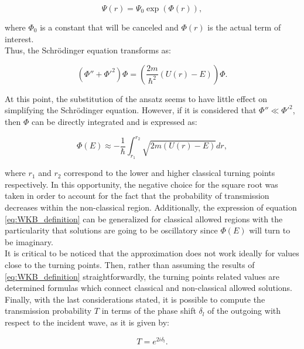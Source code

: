 \documentclass[openany]{book}
\begin{document}
\begin{equation} \label{eq:WKB_ansatz}
	\Psi(r) = \Psi_0\exp{(\Phi(r))},
\end{equation}

where $\Phi_0$ is a constant that will be canceled and $\Phi(r)$ is the actual term of interest. \\

Thus, the Schrödinger equation transforms as: 

\begin{equation} \label{eq:WKB_schrodinger}
	\left(\Phi'' + \Phi'^{2} \right)\Phi = \left(\frac{2m}{\hbar^2} (U(r) - E)\right) \Phi.
\end{equation}

At this point, the substitution of the ansatz seems to have little effect on simplifying the Schrödinger equation. However,  if it is considered that $\Phi'' \ll \Phi'^{2}$, then $\Phi$ can be directly integrated and is expressed as:

\begin{equation} \label{eq:WKB_definition}
	\Phi(E) \approx -\frac{1}{\hbar}\int_{r_1}^{r_2} {\sqrt{2m(U(r)-E)}} dr,
\end{equation}

where $r_1$ and $r_2$ correspond to the lower and higher classical turning points respectively. In this opportunity, the negative choice for the square root was taken in order to account for the fact that the probability of transmission decreases within the non-classical region. Additionally, the expression of equation \ref{eq:WKB_definition} can be generalized for classical allowed regions with the particularity that solutions are going to be oscillatory since $\Phi(E)$ will turn to be imaginary. \\

It is critical to be noticed that the approximation does not work ideally for values close to the turning points. Then, rather than assuming the results of \ref{eq:WKB_definition} straightforwardly, the turning points related values are determined formulas which connect classical and non-classical allowed solutions. \\

Finally, with the last considerations stated, it is possible to compute the transmission probability $T$ in terms of the phase shift $\delta_l$ of the outgoing with respect to the incident wave, as it  is given by: 
 
\begin{equation} \label{eq:tunneling_transmissionProbability}
	T = e^{2i\delta_l}.
\end{equation}
\end{document}
